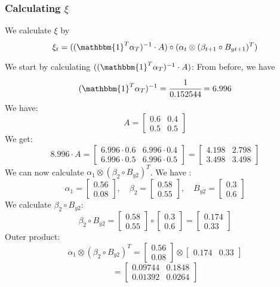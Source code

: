 \subsubsection{Calculating $\xi$}
We calculate $\xi$ by
\[
\xi_t = ((\mathbbm{1}^T\alpha_T)^{-1} \cdot A) \circ (\alpha_t \otimes (\beta_{t+1} \circ B_{yt+1})^T)
\]

We start by calculating $((\mathbbm{1}^T\alpha_T)^{-1} \cdot A)$:
From before, we have 
\[
(\mathbbm{1}^T\alpha_T)^{-1} = \cfrac{1}{0.152544} = 6.996
\]
We have:
\[
  A = \begin{bmatrix}
  0.6 & 0.4 \\
  0.5 & 0.5
  \end{bmatrix}
\]
We get:
\[
8.996 \cdot A = \begin{bmatrix}
    6.996 \cdot 0.6 & 6.996 \cdot 0.4 \\ 6.996 \cdot 0.5 & 6.996 \cdot 0.5
\end{bmatrix} = \begin{bmatrix}
    4.198 & 2.798 \\ 3.498 & 3.498
\end{bmatrix}
\]
We can now calculate $\alpha_1 \otimes (\beta_2 \circ B_{y2})^T$.
We have 
:
\[
\alpha_1 = \begin{bmatrix}
    0.56 \\ 0.08
\end{bmatrix}, \quad \beta_2 = \begin{bmatrix}
    0.58 \\ 0.55
\end{bmatrix}, \quad B_{y2} = \begin{bmatrix}
    0.3 \\ 0.6
\end{bmatrix}
\]
We calculate $\beta_2 \circ B_{y2}$:
\[
\beta_2 \circ B_{y2} = \begin{bmatrix}
    0.58 \\ 0.55
\end{bmatrix} \circ \begin{bmatrix}
    0.3 \\ 0.6
\end{bmatrix} = \begin{bmatrix}
    0.174 \\ 0.33
\end{bmatrix}
\]
Outer product:
\[
\alpha_1 \otimes (\beta_2 \circ B_{y2})^T = \begin{bmatrix}
    0.56 \\ 0.08
\end{bmatrix} \otimes \begin{bmatrix}
    0.174 & 0.33
\end{bmatrix} \] \[ = \begin{bmatrix}
    0.09744 & 0.1848 \\ 0.01392 & 0.0264
\end{bmatrix}
\]

